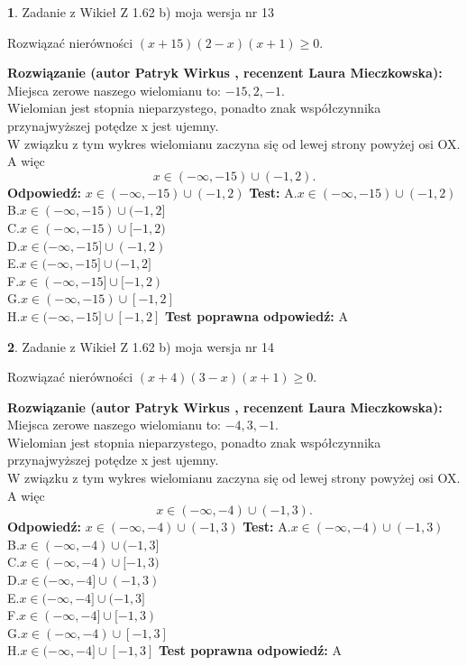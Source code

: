 \documentclass[12pt, a4paper]{article}
\theoremstyle{definition} %
\newtheorem{zad}{}
\newcommand{\zadStart}[1]{\begin{zad}#1\newline}
\newcommand{\zadStop}{\end{zad}}
\newcommand{\rozwStart}[2]{\noindent \textbf{Rozwiązanie (autor #1 , recenzent #2): }\newline}
\newcommand{\rozwStop}{\newline}
\newcommand{\odpStart}{\noindent \textbf{Odpowiedź:}\newline}
\newcommand{\odpStop}{\newline}
\newcommand{\testStart}{\noindent \textbf{Test:}\newline}
\newcommand{\testStop}{\newline}
\newcommand{\kluczStart}{\noindent \textbf{Test poprawna odpowiedź:}\newline}
\newcommand{\kluczStop}{\newline}
\begin{document}
\zadStart{Zadanie z Wikieł Z 1.62 b) moja wersja nr 13}

Rozwiązać nierówności $(x+15)(2-x)(x+1)\ge0$.
\zadStop
\rozwStart{Patryk Wirkus}{Laura Mieczkowska}
Miejsca zerowe naszego wielomianu to: $-15, 2, -1$.\\
Wielomian jest stopnia nieparzystego, ponadto znak współczynnika przy\linebreak najwyższej potędze x jest ujemny.\\ W związku z tym wykres wielomianu zaczyna się od lewej strony powyżej osi OX. A więc $$x \in (-\infty,-15) \cup (-1,2).$$
\rozwStop
\odpStart
$x \in (-\infty,-15) \cup (-1,2)$
\odpStop
\testStart
A.$x \in (-\infty,-15) \cup (-1,2)$\\
B.$x \in (-\infty,-15) \cup (-1,2]$\\
C.$x \in (-\infty,-15) \cup [-1,2)$\\
D.$x \in (-\infty,-15] \cup (-1,2)$\\
E.$x \in (-\infty,-15] \cup (-1,2]$\\
F.$x \in (-\infty,-15] \cup [-1,2)$\\
G.$x \in (-\infty,-15) \cup [-1,2]$\\
H.$x \in (-\infty,-15] \cup [-1,2]$
\testStop
\kluczStart
A
\kluczStop



\zadStart{Zadanie z Wikieł Z 1.62 b) moja wersja nr 14}

Rozwiązać nierówności $(x+4)(3-x)(x+1)\ge0$.
\zadStop
\rozwStart{Patryk Wirkus}{Laura Mieczkowska}
Miejsca zerowe naszego wielomianu to: $-4, 3, -1$.\\
Wielomian jest stopnia nieparzystego, ponadto znak współczynnika przy\linebreak najwyższej potędze x jest ujemny.\\ W związku z tym wykres wielomianu zaczyna się od lewej strony powyżej osi OX. A więc $$x \in (-\infty,-4) \cup (-1,3).$$
\rozwStop
\odpStart
$x \in (-\infty,-4) \cup (-1,3)$
\odpStop
\testStart
A.$x \in (-\infty,-4) \cup (-1,3)$\\
B.$x \in (-\infty,-4) \cup (-1,3]$\\
C.$x \in (-\infty,-4) \cup [-1,3)$\\
D.$x \in (-\infty,-4] \cup (-1,3)$\\
E.$x \in (-\infty,-4] \cup (-1,3]$\\
F.$x \in (-\infty,-4] \cup [-1,3)$\\
G.$x \in (-\infty,-4) \cup [-1,3]$\\
H.$x \in (-\infty,-4] \cup [-1,3]$
\testStop
\kluczStart
A
\kluczStop
\end{document}
